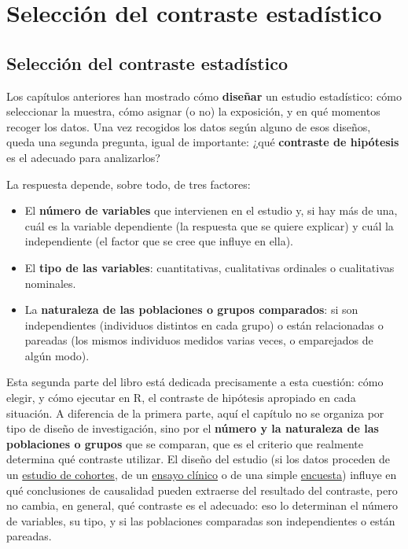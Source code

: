 \documentclass[
  spanish,
  a4paper,
]{scrreport}
\providecommand{\tightlist}{%
  \setlength{\itemsep}{0pt}\setlength{\parskip}{0pt}}
\theoremstyle{definition}
\theoremstyle{definition}
\theoremstyle{remark}
\begin{document}
\part{Selección del contraste estadístico}

\chapter{Selección del contraste
estadístico}\label{selecciuxf3n-del-contraste-estaduxedstico-1}

Los capítulos anteriores han mostrado cómo \textbf{diseñar} un estudio
estadístico: cómo seleccionar la muestra, cómo asignar (o no) la
exposición, y en qué momentos recoger los datos. Una vez recogidos los
datos según alguno de esos diseños, queda una segunda pregunta, igual de
importante: ¿qué \textbf{contraste de hipótesis} es el adecuado para
analizarlos?

La respuesta depende, sobre todo, de tres factores:

\begin{itemize}
\tightlist
\item
  El \textbf{número de variables} que intervienen en el estudio y, si
  hay más de una, cuál es la variable dependiente (la respuesta que se
  quiere explicar) y cuál la independiente (el factor que se cree que
  influye en ella).
\item
  El \textbf{tipo de las variables}: cuantitativas, cualitativas
  ordinales o cualitativas nominales.
\item
  La \textbf{naturaleza de las poblaciones o grupos comparados}: si son
  independientes (individuos distintos en cada grupo) o están
  relacionadas o pareadas (los mismos individuos medidos varias veces, o
  emparejados de algún modo).
\end{itemize}

Esta segunda parte del libro está dedicada precisamente a esta cuestión:
cómo elegir, y cómo ejecutar en R, el contraste de hipótesis apropiado
en cada situación. A diferencia de la primera parte, aquí el capítulo no
se organiza por tipo de diseño de investigación, sino por el
\textbf{número y la naturaleza de las poblaciones o grupos} que se
comparan, que es el criterio que realmente determina qué contraste
utilizar. El diseño del estudio (si los datos proceden de un
\hyperref[estudios-de-cohortes]{estudio de cohortes}, de un
\hyperref[estudios-experimentales]{ensayo clínico} o de una simple
\hyperref[encuestas-y-diseuxf1o-de-muestreo]{encuesta}) influye en qué
conclusiones de causalidad pueden extraerse del resultado del contraste,
pero no cambia, en general, qué contraste es el adecuado: eso lo
determinan el número de variables, su tipo, y si las poblaciones
comparadas son independientes o están pareadas.
\end{document}

